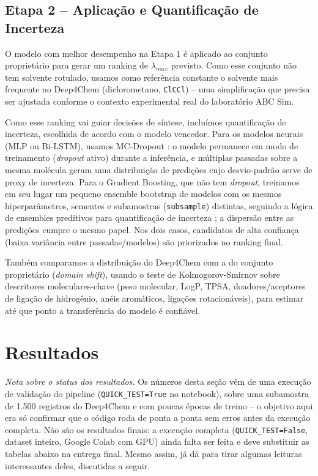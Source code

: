 \documentclass[12pt]{article}
\begin{document}
\subsection{Etapa 2 -- Aplicação e Quantificação de Incerteza}

O modelo com melhor desempenho na Etapa 1 é aplicado ao conjunto proprietário para gerar um ranking de $\lambda_{max}$ previsto. Como esse conjunto não tem solvente rotulado, usamos como referência constante o solvente mais frequente no Deep4Chem (diclorometano, \texttt{ClCCl}) -- uma simplificação que precisa ser ajustada conforme o contexto experimental real do laboratório ABC Sim.

Como esse ranking vai guiar decisões de síntese, incluímos quantificação de incerteza, escolhida de acordo com o modelo vencedor. Para os modelos neurais (MLP ou Bi-LSTM), usamos MC-Dropout \cite{gal2016,srivastava2014}: o modelo permanece em modo de treinamento (\textit{dropout} ativo) durante a inferência, e múltiplas passadas sobre a mesma molécula geram uma distribuição de predições cujo desvio-padrão serve de proxy de incerteza. Para o Gradient Boosting, que não tem \textit{dropout}, treinamos em seu lugar um pequeno ensemble bootstrap de modelos com os mesmos hiperparâmetros, sementes e subamostras (\texttt{subsample}) distintas, seguindo a lógica de ensembles preditivos para quantificação de incerteza \cite{lakshminarayanan2017}; a dispersão entre as predições cumpre o mesmo papel. Nos dois casos, candidatos de alta confiança (baixa variância entre passadas/modelos) são priorizados no ranking final.

Também comparamos a distribuição do Deep4Chem com a do conjunto proprietário (\textit{domain shift}), usando o teste de Kolmogorov-Smirnov sobre descritores moleculares-chave (peso molecular, LogP, TPSA, doadores/aceptores de ligação de hidrogênio, anéis aromáticos, ligações rotacionáveis), para estimar até que ponto a transferência do modelo é confiável.

\section{Resultados}

\textit{Nota sobre o status dos resultados.} Os números desta seção vêm de uma execução de validação do pipeline (\texttt{QUICK\_TEST=True} no notebook), sobre uma subamostra de 1.500 registros do Deep4Chem e com poucas épocas de treino -- o objetivo aqui era só confirmar que o código roda de ponta a ponta sem erros antes da execução completa. Não são os resultados finais: a execução completa (\texttt{QUICK\_TEST=False}, dataset inteiro, Google Colab com GPU) ainda falta ser feita e deve substituir as tabelas abaixo na entrega final. Mesmo assim, já dá para tirar algumas leituras interessantes deles, discutidas a seguir.
\end{document}
